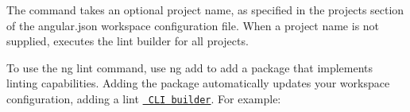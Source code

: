 The command takes an optional project name, as specified in the {\ttfamily projects} section of the {\ttfamily angular.\+json} workspace configuration file. When a project name is not supplied, executes the {\ttfamily lint} builder for all projects.

To use the {\ttfamily ng lint} command, use {\ttfamily ng add} to add a package that implements linting capabilities. Adding the package automatically updates your workspace configuration, adding a lint \href{guide/cli-builder}{\texttt{ CLI builder}}. For example\+:


\begin{DoxyCode}{0}
\DoxyCodeLine{      \}}
\DoxyCodeLine{    \}}
\DoxyCodeLine{  \}}
\DoxyCodeLine{\}}

\end{DoxyCode}
 